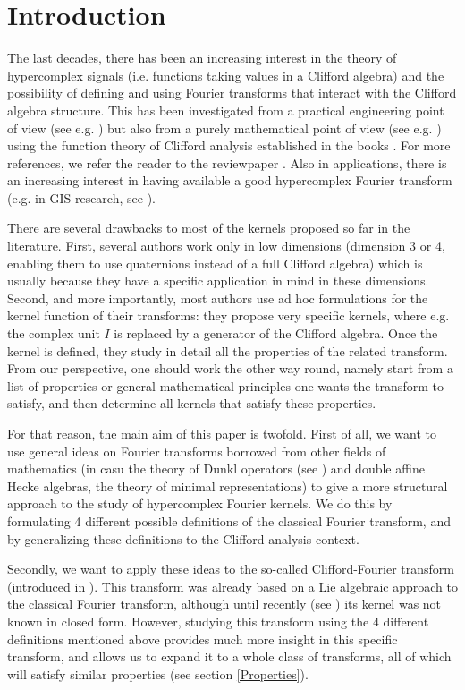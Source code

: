 \documentclass{amsart}
\theoremstyle{remark}
\begin{document}
\section{Introduction}

The last decades, there has been an increasing interest in the theory of hypercomplex signals (i.e. functions taking values in a Clifford algebra) and the possibility of defining and using Fourier transforms that interact with the Clifford algebra structure. This has been investigated from a practical engineering point of view (see e.g. \cite{MR1875365, Ebl1, Ebl2, MR2460142, Fel}) but also from a purely mathematical point of view (see e.g. \cite{MR1887633, MR2200115, MR1308706, MR2226529}) using the function theory of Clifford analysis established in the books \cite{MR697564, MR1169463}. For more references, we refer the reader to the reviewpaper \cite{AIEP}.
Also in applications, there is an increasing interest in having available a good hypercomplex Fourier transform (e.g. in GIS research, see \cite{GIS}).

There are several drawbacks to most of the kernels proposed so far in the literature.  First, several authors work only in low dimensions (dimension 3 or 4, enabling them to use quaternions instead of a full Clifford algebra) which is usually because they have a specific application in mind in these dimensions. Second, and more importantly, most authors use ad hoc formulations for the kernel function of their transforms: they propose very specific kernels, where e.g. the complex unit $I$ is replaced by a generator of the Clifford algebra. Once the kernel is defined, they study in detail all the properties of the related transform. From our perspective, one should work the other way round, namely start from a list of properties or general mathematical principles one wants the transform to satisfy, and then determine all kernels that satisfy these properties. 

For that reason, the main aim of this paper is twofold. First of all, we want to use general ideas on Fourier transforms borrowed from other fields of mathematics (in casu the theory of Dunkl operators (see \cite{MR1827871}) and double affine Hecke algebras, the theory of minimal representations) to give a more structural approach to the study of hypercomplex Fourier kernels. We do this by formulating 4 different possible definitions of the classical Fourier transform, and by generalizing these definitions to the Clifford analysis context. 

Secondly, we want to apply these ideas to the so-called Clifford-Fourier transform (introduced in \cite{MR2190678}). This transform was already based on a Lie algebraic approach to the classical Fourier transform, although until recently (see \cite{DBXu}) its kernel was not known in closed form. However, studying this transform using the 4 different definitions mentioned above provides much more insight in this specific transform, and allows us to expand it to a whole class of transforms, all of which will satisfy similar properties (see section \ref{Properties}).
\end{document}
